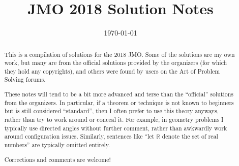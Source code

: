 \documentclass[11pt]{scrartcl}
\title{JMO 2018 Solution Notes}
\date{\today}
\begin{document}
\maketitle

\begin{abstract}
This is a compilation of solutions
for the 2018 JMO.
Some of the solutions are my own work,
but many are from the official solutions provided by the organizers
(for which they hold any copyrights),
and others were found by users on the Art of Problem Solving forums.

These notes will tend to be a bit more advanced and terse than the ``official''
solutions from the organizers.
In particular, if a theorem or technique is not known to beginners
but is still considered ``standard'', then I often prefer to
use this theory anyways, rather than try to work around or conceal it.
For example, in geometry problems I typically use directed angles
without further comment, rather than awkwardly work around configuration issues.
Similarly, sentences like ``let $\mathbb{R}$ denote the set of real numbers''
are typically omitted entirely.

Corrections and comments are welcome!
\end{abstract}

\tableofcontents
\newpage

\addtocounter{section}{-1}
\end{document}
